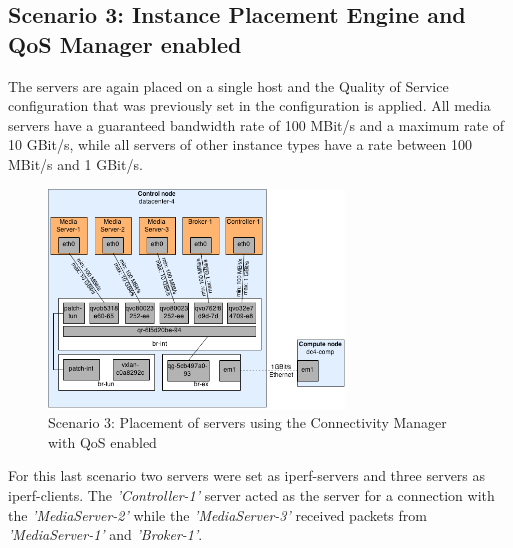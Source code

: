 \subsection{Scenario 3: Instance Placement Engine and QoS Manager enabled}

The servers are again placed on a single host and the Quality of Service configuration that was previously set in the configuration is applied. All media servers have a guaranteed bandwidth rate of 100 MBit/s and a maximum rate of 10 GBit/s, while all servers of other instance types have a rate between 100 MBit/s and 1 GBit/s.

\begin{figure}[H]
\centering

\includegraphics[width=0.7\textwidth]{images/evaluation/testbed_scenario3}

\caption{Scenario 3: Placement of servers using the Connectivity Manager with QoS enabled}
\end{figure}

For this last scenario two servers were set as iperf-servers and three servers as iperf-clients. The \textit{'Controller-1'} server acted as the server for a connection with the \textit{'MediaServer-2'} while the \textit{'MediaServer-3'} received packets from \textit{'MediaServer-1'} and \textit{'Broker-1'}.

